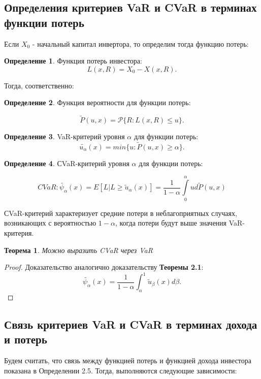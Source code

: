 \documentclass[18pt,a4paper]{article}
\theoremstyle{plain}
\newtheorem{Th}{Теорема}[section]
\theoremstyle{definition}
\newtheorem{Def}{Определение}[section]
\begin{document}
\centering\subsection{Определения критериев VaR и CVaR в терминах функции потерь}
\flushleft
Если $X_0$ - начальный капитал инвертора, то определим тогда функцию потерь:

\begin{Def} \label{main}
Функция потерь инвестора:
$$
L(x, R) = X_0 - X(x, R).
$$
\end{Def}

Тогда, соответственно:

\begin{Def} \label{main}
Функция вероятности для функции потерь:

$$
\tilde{P}(u, x) =  \mathcal{P}\{R:L(x,R) \le u\}.
$$
\end{Def}

\begin{Def} \label{main}
VaR-критерий уровня $\alpha$ для функции потерь:
$$
\tilde{u_\alpha}(x)=min\{u:\tilde{P}(u, x) \ge \alpha\}.
$$
\end{Def}
\begin{Def} \label{main}
СVaR-критерий уровня $\alpha$ для функции потерь:

$$
CVaR: \tilde{\psi_\alpha}(x) = E[L | L \ge \tilde{u}_\alpha (x)] = \frac{1}{1-\alpha} \int\limits_{0}^{\alpha} u d\tilde{P}(u, x)
$$
\end{Def}

СVaR-критерий характеризует средние потери в неблагоприятных случаях, возникающих с вероятностью $1-\alpha$, когда потери будут выше значения VaR-критерия.\\

\begin{Th} \label{main} Можно выразить CVaR через VaR
\end{Th}
\begin{proof}
Доказательство аналогично доказательству \textbf{Теоремы 2.1}:
$$
\tilde{\psi_\alpha}(x)=\frac{1}{1-\alpha}\int_\alpha^1 \tilde{u}_\beta(x)d\beta.
$$
\end{proof}

\centering\subsection{Связь критериев VaR и CVaR в терминах дохода и потерь}
\flushleft
Будем считать, что связь между функцией потерь и функцией дохода инвестора показана в Определении 2.5. Тогда, выполняются следующие зависимости:\\
\vspace{2pc}
\end{document}
